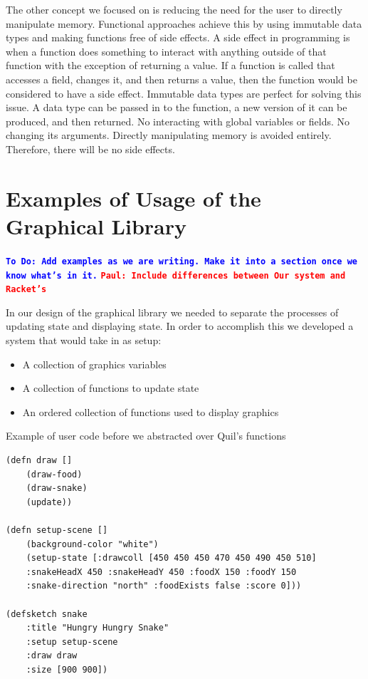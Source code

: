 \documentclass[12pt]{article}
\newcommand{\comment}[1]{{\bf \tt  {#1}}}
\newcommand{\todo}[1]{\textcolor{blue}{\comment{To Do: {#1}}}}
\newcommand{\pscomment}[1]{\textcolor{red}{\comment{Paul: {#1}}}}
\begin{document}
The other concept we focused on is reducing the need for the user to directly manipulate memory. Functional approaches achieve this by using immutable data types and making functions free of side effects. A side effect in programming is when a function does something to interact with anything outside of that function with the exception of returning a value. If a function is called that accesses a field, changes it, and then returns a value, then the function would be considered to have a side effect. Immutable data types are perfect for solving this issue. A data type can be passed in to the function, a new version of it can be produced, and then returned. No interacting with global variables or fields. No changing its arguments. Directly manipulating memory is avoided entirely. Therefore, there will be no side effects. 


\section{Examples of Usage of the Graphical Library}\label{sec:usage}
\todo{Add examples as we are writing.  Make it into a section once we know what's in it.}
\pscomment{Include differences between Our system and Racket's}

In our design of the graphical library we needed to separate the processes of updating state and displaying state. In order to accomplish this we developed a system that would take in as setup:
\begin{itemize}
	\item A collection of graphics variables
	\item A collection of functions to update state
	\item An ordered collection of functions used to display graphics
\end{itemize}

Example of user code before we abstracted over Quil's functions
\begin{verbatim}
(defn draw []
	(draw-food)
	(draw-snake)
	(update))

(defn setup-scene []
	(background-color "white")
	(setup-state [:drawcoll [450 450 450 470 450 490 450 510] 
	:snakeHeadX 450 :snakeHeadY 450 :foodX 150 :foodY 150 
	:snake-direction "north" :foodExists false :score 0]))

(defsketch snake 
	:title "Hungry Hungry Snake"
	:setup setup-scene
	:draw draw 
	:size [900 900])
\end{verbatim}
\end{document}
